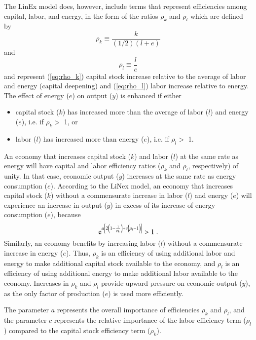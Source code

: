 \documentclass[preprint,authoryear,12pt]{elsarticle}
\begin{document}
The LinEx model does, however, include terms that represent
efficiencies among capital, labor, and energy, in the form of 
the ratios $\rho_k$ and $\rho_l$ which are defined by
%
\begin{equation} \label{eq:rho_k}
  \rho_k \equiv \frac{k}{(1/2)(l+e)}
\end{equation}
%
and
%
\begin{equation} \label{eq:rho_l}
  \rho_l \equiv \frac{l}{e}
\end{equation}
%
and represent 
%
(\ref{eq:rho_k}) capital stock increase relative to the average of labor and energy (capital deepening) and 
(\ref{eq:rho_l}) labor increase relative to energy.
The effect of energy ($e$) on output ($y$) is enhanced if either
%
\begin{itemize}
\item{capital stock ($k$) has increased more than the average 
      of labor ($l$) and energy ($e$), i.e. if $\rho_k >$ 1, or}
\item{labor ($l$) has increased more than energy ($e$), i.e. if $\rho_l >$ 1.}
\end{itemize}
%
An economy that increases 
capital stock ($k$) and labor ($l$) at the same rate as energy will have
capital and labor efficiency ratios ($\rho_k$ and $\rho_l$, respectively) of unity.
In that case, economic output ($y$) increases at the same rate as energy consumption ($e$).
According to the LiNex model, an economy that increases 
capital stock ($k$) without a commensurate increase in labor ($l$) 
and energy ($e$) will experience an increase in output ($y$) in excess 
of its increase of energy consumption ($e$), because
%
\begin{equation}
    \mathrm{e}^{a \left[2 \left(1 - \frac{1}{\rho_k} \right) 
    + c \left(\vphantom{\frac{1}{\rho_k}}\rho_l - 1 \right)\right]}
	> 1 \; .
\end{equation}
%
Similarly, an economy benefits by increasing labor ($l$) 
without a commensurate increase in energy ($e$). 
Thus, $\rho_k$ is an 
efficiency of using additional labor and energy to make 
additional capital stock available to the economy, 
and $\rho_l$ is an efficiency of using additional energy to make 
additional labor available to the economy. 
Increases in $\rho_k$ and $\rho_l$ provide upward pressure on economic output ($y$),
as the only factor of production ($e$) is used more efficiently.

The parameter $a$ represents the overall importance of efficiencies $\rho_k$ and $\rho_l$, 
and the parameter $c$ represents the relative importance 
of the labor efficiency term ($\rho_l$) compared to the capital stock efficiency term ($\rho_k$). 
\end{document}
